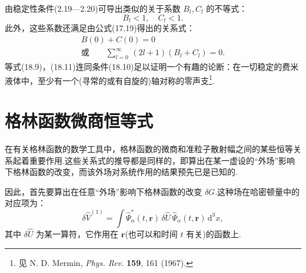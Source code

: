 由稳定性条件(2.19—2.20)可导出类似的关于系数 $B_l,C_l$ 的不等式：
\begin{equation}
  B_l<1,\quad C_l<1.
\end{equation}
此外，这些系数还满足由公式(17.19)得出的关系式：
\begin{equation}
\begin{gathered}
  B(0)+C(0)=0\\
  \text{或}\qquad\sum_{l=0}^{\infty}\,(2l+1)(B_l+C_l)=0.
\end{gathered}
\end{equation}
等式(18.9)，(18.11)连同条件(18.10)足以证明一个有趣的论断：在一切稳定的费米液体中，至少有一个(寻常的或有自旋的)轴对称的零声支\footnote{见 N. D. Mermin, \emph{Phys. Rev.} \textbf{159}, 161 (1967).}.

\section{格林函数微商恒等式}

在有关格林函数的数学工具中，格林函数的微商和准粒子散射幅之间的某些恒等关系起着重要作用.这些关系式的推导都是同样的，即算出在某一虚设的“外场”影响下格林函数的改变，而该外场对系统作用的结果预先已是已知的.

因此，首先要算出在任意“外场”影响下格林函数的改变 $\delta G$.这种场在哈密顿量中的对应项为：
\begin{equation}
  \delta\hat{V}^{(1)}=\int\hat{\Psi}^{*}_{\alpha}(t,\bm{r})\,\delta\hat{U}\,\hat{\Psi}_{\alpha}(t,\bm{r})\,\mathrm{d}^3x,
\end{equation}
其中 $\delta\hat{U}$ 为某一算符，它作用在 $\bm r$(也可以和时间 $t$ 有关)的函数上.

